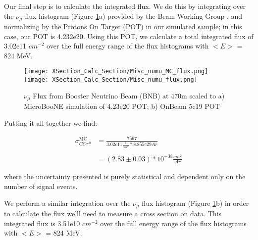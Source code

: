 \par Our final step is to calculate the integrated flux.  We do this by integrating over the $\nu_\mu$ flux histogram (Figure \ref{fig:flux}a) provided by the Beam Working Group \cite{bib:flux}, and normalizing by the Protons On Target (POT) in our simulated sample; in this case, our POT is 4.232e20.  Using this POT, we calculate a total integrated flux of 3.02e11 $cm^{-2}$ over the full energy range of the flux histograms with $<E>$ = 824 MeV. 
\begin{figure}[H]
\texttt{[image: XSection\_Calc\_Section/Misc\_numu\_MC\_flux.png]}
\texttt{[image: XSection\_Calc\_Section/Misc\_numu\_flux.png]}

\caption{$\nu_\mu$ Flux from Booster Neutrino Beam (BNB) at 470m scaled to a) MicroBooNE simulation of 4.23e20 POT; b) OnBeam 5e19 POT}
\label{fig:flux}
\end{figure}

\noindent Putting it all together we find:


\begin{align}
\sigma^{\text{MC}}_{CC\pi^0} &= \frac{7567}{3.02e11 \frac{1}{cm^2} * 8.855e29 Ar } \\\\
&= (2.83 \pm 0.03) *10^{-38} \frac{cm^2}{Ar}
\end{align}


\noindent where the uncertainty presented is purely statistical and dependent only on the number of signal events.  

\par We perform a similar integration over the $\nu_\mu$ flux histogram (Figure \ref{fig:flux}b) in order to calculate the flux we'll need to measure a cross section on data. This integrated flux is 3.51e10 $cm^{-2}$ over the full energy range of the flux histograms with $<E>$ = 824 MeV. 


